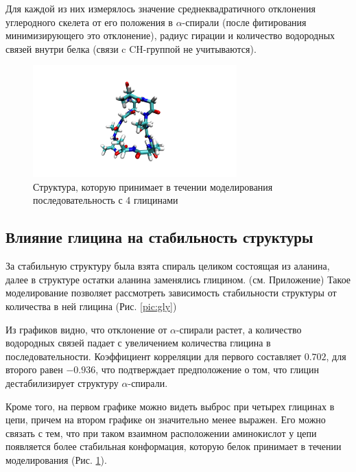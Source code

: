 \documentclass[
11pt,%
tightenlines,%
twoside,%
onecolumn,%
nofloats,%
nobibnotes,%
nofootinbib,%
superscriptaddress,%
noshowpacs,%
centertags]%
{revtex4}
\begin{document}
Для каждой из них измерялось значение среднеквадратичного отклонения
углеродного скелета от его положения в $\alpha$-спирали (после фитирования минимизирующего это отклонение),
радиус гирации и количество водородных связей внутри белка (связи c CH-группой не учитываются).

\begin{figure}[h]
	\centering
	\includegraphics[width=0.7\textwidth]{gly4}
	\caption{Структура, которую принимает в течении моделирования последовательность с 4 глицинами}
	\label{pic:4gly}
\end{figure}

\subsection{Влияние глицина на стабильность структуры}
За стабильную структуру была взята спираль целиком состоящая из аланина, 
далее в структуре остатки аланина заменялись глицином. (см. Приложение)
Такое моделирование позволяет рассмотреть зависимость стабильности структуры от количества в ней глицина (Рис. \ref{pic:gly}) \par


Из графиков видно, что отклонение от $\alpha$-спирали растет, 
а количество водородных связей падает с увеличением количества глицина в последовательности.
Коэффициент корреляции для первого составляет $0.702$, для второго равен $-0.936$, 
что подтверждает предположение о том, что глицин дестабилизирует структуру $\alpha$-спирали. \par

Кроме того, на первом графике можно видеть выброс при четырех глицинах в цепи, 
причем на втором графике он значительно менее выражен. 
Его можно связать с тем, что при таком взаимном расположении аминокислот у цепи появляется более стабильная конформация, которую белок принимает в течении моделирования (Рис. \ref{pic:4gly}).
\end{document}

